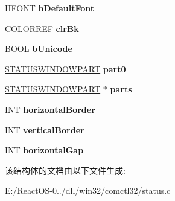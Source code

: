\begin{DoxyCompactItemize}
\mbox{\label{struct_s_t_a_t_u_s___i_n_f_o_a84380a23be65db93d59a426942c97715}} 
H\+F\+O\+NT {\bfseries h\+Default\+Font}
\item 
\mbox{\label{struct_s_t_a_t_u_s___i_n_f_o_a5bc874d15abb64ad1339331934f32b92}} 
C\+O\+L\+O\+R\+R\+EF {\bfseries clr\+Bk}
\item 
\mbox{\label{struct_s_t_a_t_u_s___i_n_f_o_ac7d69830931268b90f4ece96b7f9d52e}} 
B\+O\+OL {\bfseries b\+Unicode}
\item 
\mbox{\label{struct_s_t_a_t_u_s___i_n_f_o_a60f92fae6593acc151fa6e35d63bb9b7}} 
\hyperlink{struct_s_t_a_t_u_s_w_i_n_d_o_w_p_a_r_t}{S\+T\+A\+T\+U\+S\+W\+I\+N\+D\+O\+W\+P\+A\+RT} {\bfseries part0}
\item 
\mbox{\label{struct_s_t_a_t_u_s___i_n_f_o_aab8f7e0cbe4228281df684a00aa8a1dd}} 
\hyperlink{struct_s_t_a_t_u_s_w_i_n_d_o_w_p_a_r_t}{S\+T\+A\+T\+U\+S\+W\+I\+N\+D\+O\+W\+P\+A\+RT} $\ast$ {\bfseries parts}
\item 
\mbox{\label{struct_s_t_a_t_u_s___i_n_f_o_ab841f80823949318d128057b34500c2d}} 
I\+NT {\bfseries horizontal\+Border}
\item 
\mbox{\label{struct_s_t_a_t_u_s___i_n_f_o_a05b26e02a3834a15f9c6bff3dbc82d77}} 
I\+NT {\bfseries vertical\+Border}
\item 
\mbox{\label{struct_s_t_a_t_u_s___i_n_f_o_af0a40ddd66f2ef4a77ae096d4564e69b}} 
I\+NT {\bfseries horizontal\+Gap}
\end{DoxyCompactItemize}


该结构体的文档由以下文件生成\+:\begin{DoxyCompactItemize}
\item 
E\+:/\+React\+O\+S-\/0../dll/win32/comctl32/status.\+c\end{DoxyCompactItemize}
